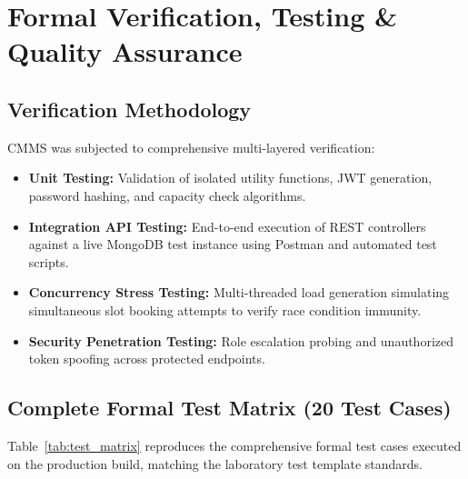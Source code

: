 \documentclass[11pt,a4paper]{article}
\begin{document}
\section{Formal Verification, Testing \& Quality Assurance}

\subsection{Verification Methodology}
CMMS was subjected to comprehensive multi-layered verification:
\begin{itemize}[leftmargin=1.4em, itemsep=0.15em]
  \item \textbf{Unit Testing:} Validation of isolated utility functions, JWT generation, password hashing, and capacity check algorithms.
  \item \textbf{Integration API Testing:} End-to-end execution of REST controllers against a live MongoDB test instance using Postman and automated test scripts.
  \item \textbf{Concurrency Stress Testing:} Multi-threaded load generation simulating simultaneous slot booking attempts to verify race condition immunity.
  \item \textbf{Security Penetration Testing:} Role escalation probing and unauthorized token spoofing across protected endpoints.
\end{itemize}

\subsection{Complete Formal Test Matrix (20 Test Cases)}
Table~\ref{tab:test_matrix} reproduces the comprehensive formal test cases executed on the production build, matching the laboratory test template standards.
\end{document}
